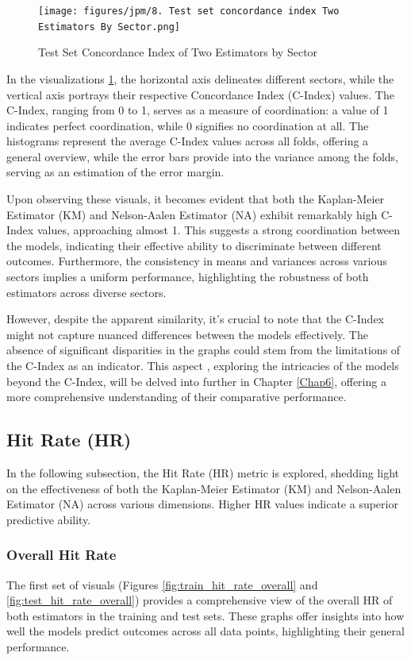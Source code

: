 \begin{figure}[H]
    \centering
    \texttt{[image: figures/jpm/8. Test set concordance index Two Estimators By Sector.png]}
    \caption{Test Set Concordance Index of Two Estimators by Sector}
    \label{fig:test_concordance_index}
\end{figure}

In the visualizations \ref{fig:test_concordance_index}, the horizontal axis delineates different sectors, while the vertical axis portrays their respective Concordance Index (C-Index) values. The C-Index, ranging from 0 to 1, serves as a measure of coordination: a value of 1 indicates perfect coordination, while 0 signifies no coordination at all. The histograms represent the average C-Index values across all folds, offering a general overview, while the error bars provide into the variance among the folds, serving as an estimation of the error margin.

Upon observing these visuals, it becomes evident that both the Kaplan-Meier Estimator (KM) and Nelson-Aalen Estimator (NA) exhibit remarkably high C-Index values, approaching almost 1. This suggests a strong coordination between the models, indicating their effective ability to discriminate between different outcomes. Furthermore, the consistency in means and variances across various sectors implies a uniform performance, highlighting the robustness of both estimators across diverse sectors.

However, despite the apparent similarity, it's crucial to note that the C-Index might not capture nuanced differences between the models effectively. The absence of significant disparities in the graphs could stem from the limitations of the C-Index as an indicator. This aspect , exploring the intricacies of the models beyond the C-Index, will be delved into further in Chapter \ref{Chap6}, offering a more comprehensive understanding of their comparative performance.

\subsection{Hit Rate (HR)}
In the following subsection, the Hit Rate (HR) metric is explored, shedding light on the effectiveness of both the Kaplan-Meier Estimator (KM) and Nelson-Aalen Estimator (NA) across various dimensions. Higher HR values indicate a superior predictive ability.

\subsubsection{Overall Hit Rate}
The first set of visuals (Figures \ref{fig:train_hit_rate_overall} and \ref{fig:test_hit_rate_overall}) provides a comprehensive view of the overall HR of both estimators in the training and test sets. These graphs offer insights into how well the models predict outcomes across all data points, highlighting their general performance.

